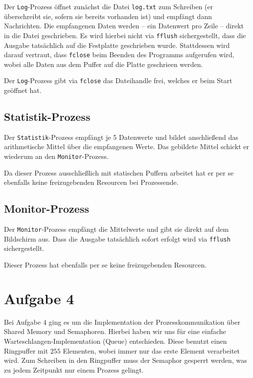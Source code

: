 \documentclass[12pt, a4paper]{scrartcl}
\begin{document}
Der \texttt{Log}-Prozess öffnet zunächst die Datei \texttt{log.txt} zum
Schreiben (er überschreibt sie, sofern sie bereits vorhanden ist) und empfängt
dann Nachrichten. Die empfangenen Daten werden -- ein Datenwert pro Zeile --
direkt in die Datei geschrieben. Es wird hierbei nicht via \texttt{fflush}
sichergestellt, dass die Ausgabe tatsächlich auf die Festplatte geschrieben
wurde. Stattdessen wird darauf vertraut, dass \texttt{fclose} beim Beenden des
Programms aufgerufen wird, wobei alle Daten aus dem Puffer auf die Platte
geschrieen werden.
\np

Der \texttt{Log}-Prozess gibt via \texttt{fclose} das Dateihandle frei, welches
er beim Start geöffnet hat.

\subsection{Statistik-Prozess}

Der \texttt{Statistik}-Prozess empfängt je 5 Datenwerte und bildet anschließend
das arithmetische Mittel über die empfangenen Werte. Das gebildete Mittel
schickt er wiederum an den \texttt{Monitor}-Prozess.
\np

Da dieser Prozess ausschließlich mit statischen Puffern arbeitet hat er per se
ebenfalls keine freizugebenden Resourcen bei Prozessende.

\subsection{Monitor-Prozess}

Der \texttt{Monitor}-Prozess empfängt die Mittelwerte und gibt sie direkt auf
dem Bildschirm aus. Dass die Ausgabe tatsächlich sofort erfolgt wird via
\texttt{fflush} sichergestellt.
\np

Dieser Prozess hat ebenfalls per se keine freizugebenden Resourcen.

\clearpage
\section{Aufgabe 4}

Bei Aufgabe 4 ging es um die Implementation der Prozesskommunikation über
Shared Memory und Semaphoren. Hierbei haben wir uns für eine einfache
Warteschlangen-Implementation (Queue) entschieden. Diese benutzt einen
Ringpuffer mit $255$ Elementen, wobei immer nur das erste Element verarbeitet
wird. Zum Schreiben in den Ringpuffer muss der Semaphor gesperrt werden, was zu
jedem Zeitpunkt nur einem Prozess gelingt.
\end{document}
